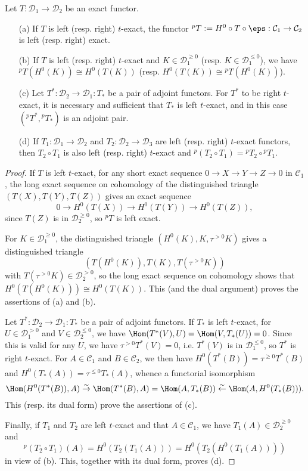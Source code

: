\begin{proposition}\label{triangle cat t-exact functor prop}
Let $T:\mathcal{D}_1\to\mathcal{D}_2$ be an exact functor.
\begin{enumerate}
    \item[(a)] If $T$ is left (resp. right) $t$-exact, the functor $^pT:=H^0\circ T\circ\eps:\mathcal{C}_1\to\mathcal{C}_2$ is left (resp. right) exact.
    \item[(b)] If $T$ is left (resp. right) $t$-exact and $K\in\mathcal{D}_1^{\geq 0}$ (resp. $K\in\mathcal{D}_1^{\leq 0}$), we have $^pT(H^0(K))\cong H^0(T(K))$ (resp. $H^0(T(K))\cong {^p\!T}(H^0(K))$).
    \item[(c)] Let $T^*:\mathcal{D}_2\to\mathcal{D}_1:T_*$ be a pair of adjoint functors. For $T^*$ to be right $t$-exact, it is necessary and sufficient that $T_*$ is left $t$-exact, and in this case $({^p\!T^*},{^p\!T_*})$ is an adjoint pair.
    \item[(d)] If $T_1:\mathcal{D}_1\to\mathcal{D}_2$ and $T_2:\mathcal{D}_2\to\mathcal{D}_3$ are left (resp. right) $t$-exact functors, then $T_2\circ T_1$ is also left (resp. right) $t$-exact and ${^p\!(T_2\circ T_1)}={^p\!T_2}\circ {^p\!T_1}$.  
\end{enumerate}
\end{proposition}
\begin{proof}
If $T$ is left $t$-exact, for any short exact sequence $0\to X\to Y\to Z\to 0$ in $\mathcal{C}_1$, the long exact sequence on cohomology of the distinguished triangle $(T(X),T(Y),T(Z))$ gives an exact sequence
\[0\to H^0(T(X))\to H^0(T(Y))\to H^0(T(Z)),\]
since $T(Z)$ is in $\mathcal{D}_2^{\geq 0}$, so ${^p\!T}$ is left exact.\par
For $K\in\mathcal{D}_1^{\geq 0}$, the distinguished triangle $(H^0(K),K,\tau^{>0}K)$ gives a distinguished triangle
\[(T(H^0(K)),T(K),T(\tau^{>0}K))\]
with $T(\tau^{>0}K)\in\mathcal{D}_2^{>0}$, so the long exact sequence on cohomology shows that $H^0(T(H^0(K)))\cong H^0(T(K))$. This (and the dual argument) proves the assertions of (a) and (b).\par
Let $T^*:\mathcal{D}_2\to\mathcal{D}_1:T_*$ be a pair of adjoint functors. If $T_*$ is left $t$-exact, for $U\in\mathcal{D}_1^{>0}$ and $V\in\mathcal{D}_2^{\leq 0}$, we have $\Hom(T^*(V),U)=\Hom(V,T_*(U))=0$. Since this is valid for any $U$, we have $\tau^{>0}T^*(V)=0$, i.e. $T^*(V)$ is in $\mathcal{D}_1^{\leq 0}$, so $T^*$ is right $t$-exact. For $A\in\mathcal{C}_1$ and $B\in\mathcal{C}_2$, we then have $H^0(T^*(B))=\tau^{\geq 0}T^*(B)$ and $H^0(T_*(A))=\tau^{\leq 0}T_*(A)$, whence a functorial isomorphism
\[\Hom(H^0(T^*(B)),A)\stackrel{\sim}{\to} \Hom(T^*(B),A)=\Hom(A,T_*(B))\stackrel{\sim}{\leftarrow} \Hom(A,H^0(T_*(B))).\]
This (resp. its dual form) prove the assertions of (c).\par
Finally, if $T_1$ and $T_2$ are left $t$-exact and that $A\in\mathcal{C}_1$, we have $T_1(A)\in\mathcal{D}_2^{\geq 0}$ and
\[{^p\!(T_2\circ T_1)}(A)=H^0(T_2(T_1(A)))=H^0(T_2(H^0(T_1(A))))\]
in view of (b). This, together with its dual form, proves (d).
\end{proof}

